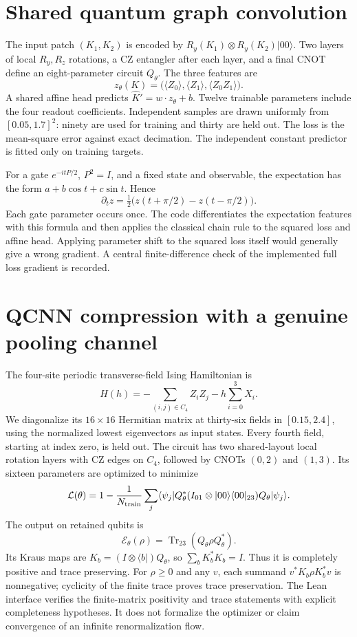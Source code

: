 \section{Shared quantum graph convolution}
The input patch $(K_1,K_2)$ is encoded by
$R_y(K_1)\otimes R_y(K_2)|00\rangle$. Two layers of local $R_y,R_z$ rotations, a CZ entangler after each layer, and a final CNOT define an eight-parameter circuit $Q_\theta$. The three features are
\[
 z_\theta(K)=\bigl(\langle Z_0\rangle,\langle Z_1\rangle,\langle Z_0Z_1\rangle\bigr).
\]
A shared affine head predicts $\widehat K'=w\cdot z_\theta+b$. Twelve trainable parameters include the four readout coefficients. Independent samples are drawn uniformly from $[0.05,1.7]^2$: ninety are used for training and thirty are held out. The loss is the mean-square error against exact decimation. The independent constant predictor is fitted only on training targets.

For a gate $e^{-itP/2}$, $P^2=I$, and a fixed state and observable, the expectation has the form $a+b\cos t+c\sin t$. Hence
\[
 \partial_t z=\tfrac12\bigl(z(t+\pi/2)-z(t-\pi/2)\bigr).
\]
Each gate parameter occurs once. The code differentiates the expectation features with this formula and then applies the classical chain rule to the squared loss and affine head. Applying parameter shift to the squared loss itself would generally give a wrong gradient. A central finite-difference check of the implemented full loss gradient is recorded.

\section{QCNN compression with a genuine pooling channel}
The four-site periodic transverse-field Ising Hamiltonian is
\[
 H(h)=-\sum_{(i,j)\in C_4}Z_iZ_j-h\sum_{i=0}^3X_i.
\]
We diagonalize its $16\times16$ Hermitian matrix at thirty-six fields in $[0.15,2.4]$, using the normalized lowest eigenvectors as input states. Every fourth field, starting at index zero, is held out. The circuit has two shared-layout local rotation layers with CZ edges on $C_4$, followed by CNOTs $(0,2)$ and $(1,3)$. Its sixteen parameters are optimized to minimize
\[
 \mathcal L(\theta)=1-\frac1{N_{\rm train}}\sum_j
 \langle\psi_j|Q_\theta^*(I_{01}\otimes|00\rangle\langle00|_{23})Q_\theta|\psi_j\rangle.
\]
The output on retained qubits is
\[
 \mathcal E_\theta(\rho)=\operatorname{Tr}_{23}(Q_\theta\rho Q_\theta^*).
\]
Its Kraus maps are $K_b=(I\otimes\langle b|)Q_\theta$, so
$\sum_bK_b^*K_b=I$. Thus it is completely positive and trace preserving. For $\rho\ge0$ and any $v$, each summand $v^*K_b\rho K_b^*v$ is nonnegative; cyclicity of the finite trace proves trace preservation. The Lean interface verifies the finite-matrix positivity and trace statements with explicit completeness hypotheses. It does not formalize the optimizer or claim convergence of an infinite renormalization flow.

